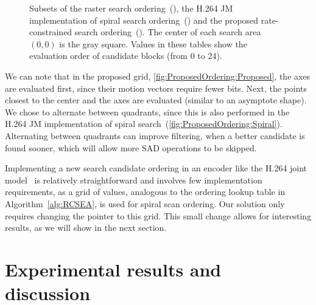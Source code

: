 \documentclass{article}
\begin{document}
\begin{figure}[htb]
\begin{subfigure}{0.25\linewidth}
\caption{}
\label{fig:ProposedOrdering:Proposed}
\end{subfigure}

\caption{Subsets of the raster search
ordering~(), the H.264 JM implementation of
spiral search ordering~() and the proposed
rate-constrained search ordering~().
The center of each search area $(0,0)$ is the gray square. Values in
these tables show the evaluation order of candidate blocks (from 0 to 24).}
\label{fig:ProposedOrdering}
\vspace{-0.5em}
\end{figure}
We can note that in the proposed grid, \autoref{fig:ProposedOrdering:Proposed}, the
axes are evaluated first, since their motion vectors require fewer bits. Next,
the points closest to the center and the axes are evaluated (similar to an
asymptote shape). We chose to alternate between quadrants, since this is also
performed in the H.264 JM implementation of spiral
search~(\autoref{fig:ProposedOrdering:Spiral}). Alternating between quadrants can
improve filtering, when a better candidate is found sooner, which will allow 
more SAD operations to be skipped.

Implementing a new search candidate ordering in an encoder like the H.264
joint model~\cite{JM} is relatively straightforward and involves few
implementation requirements, as a grid of values, analogous to the ordering lookup
table in Algorithm~\ref{alg:RCSEA}, is used for spiral scan ordering. Our
solution only requires changing the pointer to this grid. This small change
allows for interesting results, as we will show in the next section.

\vspace{-0.5em}
\section{Experimental results and discussion}
\label{sec:results}
\vspace{-0.2em}
\end{document}
